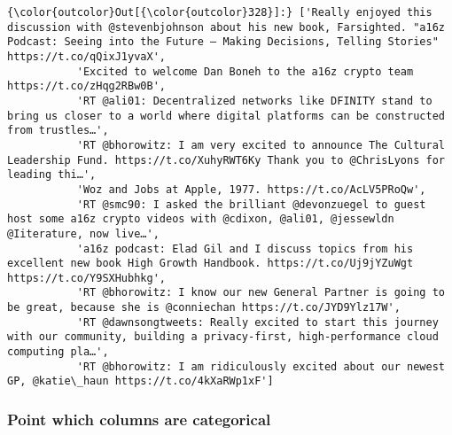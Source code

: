\documentclass[11pt]{article}
\begin{document}
\begin{Verbatim}[commandchars=\\\{\}]
{\color{outcolor}Out[{\color{outcolor}328}]:} ['Really enjoyed this discussion with @stevenbjohnson about his new book, Farsighted. "a16z Podcast: Seeing into the Future — Making Decisions, Telling Stories" https://t.co/qQixJ1yvaX',
           'Excited to welcome Dan Boneh to the a16z crypto team https://t.co/zHqg2RBw0B',
           'RT @ali01: Decentralized networks like DFINITY stand to bring us closer to a world where digital platforms can be constructed from trustles…',
           'RT @bhorowitz: I am very excited to announce The Cultural Leadership Fund. https://t.co/XuhyRWT6Ky Thank you to @ChrisLyons for leading thi…',
           'Woz and Jobs at Apple, 1977. https://t.co/AcLV5PRoQw',
           'RT @smc90: I asked the brilliant @devonzuegel to guest host some a16z crypto videos with @cdixon, @ali01, @jessewldn @Iiterature, now live…',
           'a16z podcast: Elad Gil and I discuss topics from his excellent new book High Growth Handbook. https://t.co/Uj9jYZuWgt https://t.co/Y9SXHubhkg',
           'RT @bhorowitz: I know our new General Partner is going to be great, because she is @conniechan https://t.co/JYD9Ylz17W',
           'RT @dawnsongtweets: Really excited to start this journey with our community, building a privacy-first, high-performance cloud computing pla…',
           'RT @bhorowitz: I am ridiculously excited about our newest GP, @katie\_haun https://t.co/4kXaRWp1xF']
\end{Verbatim}
            
    \subsubsection{Point which columns are
categorical}\label{point-which-columns-are-categorical}
\end{document}
